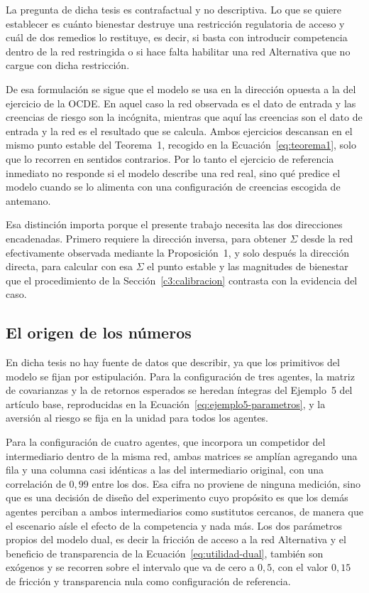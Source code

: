 La pregunta de dicha tesis es contrafactual y no descriptiva. Lo que se quiere establecer es cuánto bienestar destruye una restricción regulatoria de acceso y cuál de dos remedios lo restituye, es decir, si basta con introducir competencia dentro de la red restringida o si hace falta habilitar una red Alternativa que no cargue con dicha restricción.

De esa formulación se sigue que el modelo se usa en la dirección opuesta a la del ejercicio de la OCDE. En aquel caso la red observada es el dato de entrada y las creencias de riesgo son la incógnita, mientras que aquí las creencias son el dato de entrada y la red es el resultado que se calcula. Ambos ejercicios descansan en el mismo punto estable del Teorema~1, recogido en la Ecuación~\eqref{eq:teorema1}, solo que lo recorren en sentidos contrarios. Por lo tanto el ejercicio de referencia inmediato no responde si el modelo describe una red real, sino qué predice el modelo cuando se lo alimenta con una configuración de creencias escogida de antemano.

Esa distinción importa porque el presente trabajo necesita las dos direcciones encadenadas. Primero requiere la dirección inversa, para obtener $\Sigma$ desde la red efectivamente observada mediante la Proposición~1, y solo después la dirección directa, para calcular con esa $\Sigma$ el punto estable y las magnitudes de bienestar que el procedimiento de la Sección~\ref{c3:calibracion} contrasta con la evidencia del caso.

\subsection{El origen de los números}
\label{c4:venegas-datos}

En dicha tesis no hay fuente de datos que describir, ya que los primitivos del modelo se fijan por estipulación. Para la configuración de tres agentes, la matriz de covarianzas y la de retornos esperados se heredan íntegras del Ejemplo~5 del artículo base, reproducidas en la Ecuación~\eqref{eq:ejemplo5-parametros}, y la aversión al riesgo se fija en la unidad para todos los agentes.

Para la configuración de cuatro agentes, que incorpora un competidor del intermediario dentro de la misma red, ambas matrices se amplían agregando una fila y una columna casi idénticas a las del intermediario original, con una correlación de $0,99$ entre los dos. Esa cifra no proviene de ninguna medición, sino que es una decisión de diseño del experimento cuyo propósito es que los demás agentes perciban a ambos intermediarios como sustitutos cercanos, de manera que el escenario aísle el efecto de la competencia y nada más. Los dos parámetros propios del modelo dual, es decir la fricción de acceso a la red Alternativa y el beneficio de transparencia de la Ecuación~\eqref{eq:utilidad-dual}, también son exógenos y se recorren sobre el intervalo que va de cero a $0,5$, con el valor $0,15$ de fricción y transparencia nula como configuración de referencia.

